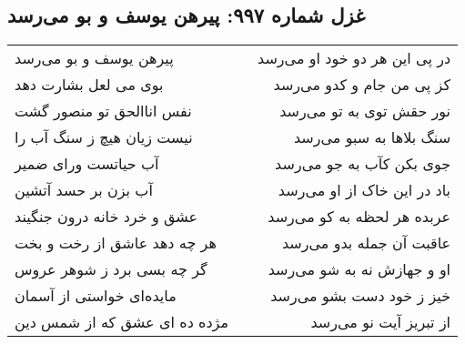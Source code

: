 \begin{center}
\section*{غزل شماره ۹۹۷: پیرهن یوسف و بو می‌رسد}
\label{sec:0997}
\begin{longtable}{l p{0.5cm} r}
پیرهن یوسف و بو می‌رسد
&&
در پی این هر دو خود او می‌رسد
\\
بوی می لعل بشارت دهد
&&
کز پی من جام و کدو می‌رسد
\\
نفس اناالحق تو منصور گشت
&&
نور حقش توی به تو می‌رسد
\\
نیست زیان هیچ ز سنگ آب را
&&
سنگ بلاها به سبو می‌رسد
\\
آب حیاتست ورای ضمیر
&&
جوی بکن کآب به جو می‌رسد
\\
آب بزن بر حسد آتشین
&&
باد در این خاک از او می‌رسد
\\
عشق و خرد خانه درون جنگیند
&&
عربده هر لحظه به کو می‌رسد
\\
هر چه دهد عاشق از رخت و بخت
&&
عاقبت آن جمله بدو می‌رسد
\\
گر چه بسی برد ز شوهر عروس
&&
او و جهازش نه به شو می‌رسد
\\
مایده‌ای خواستی از آسمان
&&
خیز ز خود دست بشو می‌رسد
\\
مژده ده ای عشق که از شمس دین
&&
از تبریز آیت نو می‌رسد
\\
\end{longtable}
\end{center}
